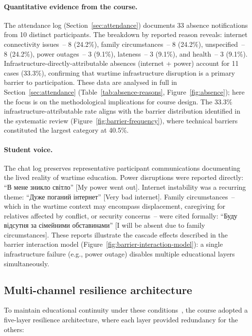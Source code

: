 \paragraph{Quantitative evidence from the course.}
The attendance log (Section~\ref{sec:attendance}) documents 33 absence notifications from 10 distinct participants. The breakdown by reported reason reveals: internet connectivity issues~-- 8 (24.2\%), family circumstances~-- 8 (24.2\%), unspecified~-- 8 (24.2\%), power outages~-- 3 (9.1\%), lateness~-- 3 (9.1\%), and health~-- 3 (9.1\%). Infrastructure-directly-attributable absences (internet + power) account for 11 cases (33.3\%), confirming that wartime infrastructure disruption is a primary barrier to participation. These data are analysed in full in Section~\ref{sec:attendance} (Table~\ref{tab:absence-reasons}, Figure~\ref{fig:absence}); here the focus is on the methodological implications for course design. The 33.3\% infrastructure-attributable rate aligns with the barrier distribution identified in the systematic review (Figure~\ref{fig:barrier-frequency}), where technical barriers constituted the largest category at 40.5\%.

\paragraph{Student voice.}
The chat log preserves representative participant communications documenting the lived reality of wartime education. Power disruptions were reported directly: ``\foreignlanguage{ukrainian}{В мене зникло світло}'' [My power went out]. Internet instability was a recurring theme: ``\foreignlanguage{ukrainian}{Дуже поганий інтернет}'' [Very bad internet]. Family circumstances~-- which in the wartime context may encompass displacement, caregiving for relatives affected by conflict, or security concerns~-- were cited formally: ``\foreignlanguage{ukrainian}{Буду відсутня за сімейними обставинами}'' [I will be absent due to family circumstances]. These reports illustrate the cascade effects described in the barrier interaction model (Figure~\ref{fig:barrier-interaction-model}): a single infrastructure failure (e.g., power outage) disables multiple educational layers simultaneously.

\subsection{Multi-channel resilience architecture}

To maintain educational continuity under these conditions~\cite{Hlianenko2024, Vovchasta2024}, the course adopted a five-layer resilience architecture, where each layer provided redundancy for the others:

